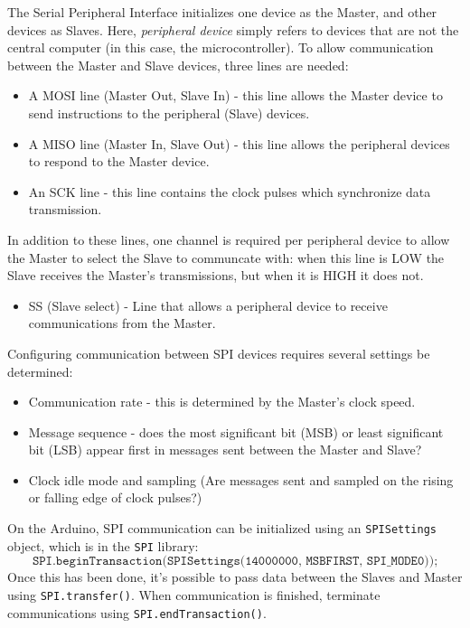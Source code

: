 \documentclass[idxtotoc,hyperref,openany]{labbook} %
\begin{document}
The Serial Peripheral Interface initializes one device as the Master, and other devices as Slaves. Here, \emph{peripheral device} simply refers to devices that are not the central computer (in this case, the microcontroller). To allow communication between the Master and Slave devices, three lines are needed:
\begin{itemize}
	\item A MOSI line (Master Out, Slave In) - this line allows the Master device to send instructions to the peripheral (Slave) devices.
	\item A MISO line (Master In, Slave Out) - this line allows the peripheral devices to respond to the Master device.
	\item An SCK line - this line contains the clock pulses which synchronize data transmission.
\end{itemize}
In addition to these lines, one channel is required per peripheral device to allow the Master to select the Slave to communcate with: when this line is LOW the Slave receives the Master's transmissions, but when it is HIGH it does not.
\begin{itemize}
	\item SS (Slave select) - Line that allows a peripheral device to receive communications from the Master.
\end{itemize}
Configuring communication between SPI devices requires several settings be determined:
\begin{itemize}
	\item Communication rate - this is determined by the Master's clock speed.
	\item Message sequence - does the most significant bit (MSB) or least significant bit (LSB) appear first in messages sent between the Master and Slave?
	\item Clock idle mode and sampling (Are messages sent and sampled on the rising or falling edge of clock pulses?)
\end{itemize}
On the Arduino, SPI communication can be initialized using an \texttt{SPISettings} object, which is in the \texttt{SPI} library:
	\[
	\texttt{SPI.beginTransaction(SPISettings(14000000, MSBFIRST, SPI\_MODE0));}
	\]
Once this has been done, it's possible to pass data between the Slaves and Master using \texttt{SPI.transfer()}. When communication is finished, terminate communications using \texttt{SPI.endTransaction()}.
 
\end{document}
